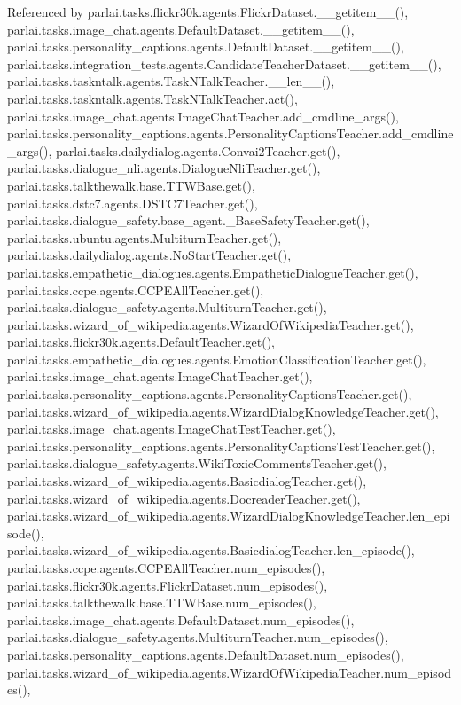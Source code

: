 Referenced by parlai.\+tasks.\+flickr30k.\+agents.\+Flickr\+Dataset.\+\_\+\+\_\+getitem\+\_\+\+\_\+(), parlai.\+tasks.\+image\+\_\+chat.\+agents.\+Default\+Dataset.\+\_\+\+\_\+getitem\+\_\+\+\_\+(), parlai.\+tasks.\+personality\+\_\+captions.\+agents.\+Default\+Dataset.\+\_\+\+\_\+getitem\+\_\+\+\_\+(), parlai.\+tasks.\+integration\+\_\+tests.\+agents.\+Candidate\+Teacher\+Dataset.\+\_\+\+\_\+getitem\+\_\+\+\_\+(), parlai.\+tasks.\+taskntalk.\+agents.\+Task\+N\+Talk\+Teacher.\+\_\+\+\_\+len\+\_\+\+\_\+(), parlai.\+tasks.\+taskntalk.\+agents.\+Task\+N\+Talk\+Teacher.\+act(), parlai.\+tasks.\+image\+\_\+chat.\+agents.\+Image\+Chat\+Teacher.\+add\+\_\+cmdline\+\_\+args(), parlai.\+tasks.\+personality\+\_\+captions.\+agents.\+Personality\+Captions\+Teacher.\+add\+\_\+cmdline\+\_\+args(), parlai.\+tasks.\+dailydialog.\+agents.\+Convai2\+Teacher.\+get(), parlai.\+tasks.\+dialogue\+\_\+nli.\+agents.\+Dialogue\+Nli\+Teacher.\+get(), parlai.\+tasks.\+talkthewalk.\+base.\+T\+T\+W\+Base.\+get(), parlai.\+tasks.\+dstc7.\+agents.\+D\+S\+T\+C7\+Teacher.\+get(), parlai.\+tasks.\+dialogue\+\_\+safety.\+base\+\_\+agent.\+\_\+\+Base\+Safety\+Teacher.\+get(), parlai.\+tasks.\+ubuntu.\+agents.\+Multiturn\+Teacher.\+get(), parlai.\+tasks.\+dailydialog.\+agents.\+No\+Start\+Teacher.\+get(), parlai.\+tasks.\+empathetic\+\_\+dialogues.\+agents.\+Empathetic\+Dialogue\+Teacher.\+get(), parlai.\+tasks.\+ccpe.\+agents.\+C\+C\+P\+E\+All\+Teacher.\+get(), parlai.\+tasks.\+dialogue\+\_\+safety.\+agents.\+Multiturn\+Teacher.\+get(), parlai.\+tasks.\+wizard\+\_\+of\+\_\+wikipedia.\+agents.\+Wizard\+Of\+Wikipedia\+Teacher.\+get(), parlai.\+tasks.\+flickr30k.\+agents.\+Default\+Teacher.\+get(), parlai.\+tasks.\+empathetic\+\_\+dialogues.\+agents.\+Emotion\+Classification\+Teacher.\+get(), parlai.\+tasks.\+image\+\_\+chat.\+agents.\+Image\+Chat\+Teacher.\+get(), parlai.\+tasks.\+personality\+\_\+captions.\+agents.\+Personality\+Captions\+Teacher.\+get(), parlai.\+tasks.\+wizard\+\_\+of\+\_\+wikipedia.\+agents.\+Wizard\+Dialog\+Knowledge\+Teacher.\+get(), parlai.\+tasks.\+image\+\_\+chat.\+agents.\+Image\+Chat\+Test\+Teacher.\+get(), parlai.\+tasks.\+personality\+\_\+captions.\+agents.\+Personality\+Captions\+Test\+Teacher.\+get(), parlai.\+tasks.\+dialogue\+\_\+safety.\+agents.\+Wiki\+Toxic\+Comments\+Teacher.\+get(), parlai.\+tasks.\+wizard\+\_\+of\+\_\+wikipedia.\+agents.\+Basicdialog\+Teacher.\+get(), parlai.\+tasks.\+wizard\+\_\+of\+\_\+wikipedia.\+agents.\+Docreader\+Teacher.\+get(), parlai.\+tasks.\+wizard\+\_\+of\+\_\+wikipedia.\+agents.\+Wizard\+Dialog\+Knowledge\+Teacher.\+len\+\_\+episode(), parlai.\+tasks.\+wizard\+\_\+of\+\_\+wikipedia.\+agents.\+Basicdialog\+Teacher.\+len\+\_\+episode(), parlai.\+tasks.\+ccpe.\+agents.\+C\+C\+P\+E\+All\+Teacher.\+num\+\_\+episodes(), parlai.\+tasks.\+flickr30k.\+agents.\+Flickr\+Dataset.\+num\+\_\+episodes(), parlai.\+tasks.\+talkthewalk.\+base.\+T\+T\+W\+Base.\+num\+\_\+episodes(), parlai.\+tasks.\+image\+\_\+chat.\+agents.\+Default\+Dataset.\+num\+\_\+episodes(), parlai.\+tasks.\+dialogue\+\_\+safety.\+agents.\+Multiturn\+Teacher.\+num\+\_\+episodes(), parlai.\+tasks.\+personality\+\_\+captions.\+agents.\+Default\+Dataset.\+num\+\_\+episodes(), parlai.\+tasks.\+wizard\+\_\+of\+\_\+wikipedia.\+agents.\+Wizard\+Of\+Wikipedia\+Teacher.\+num\+\_\+episodes(), 
